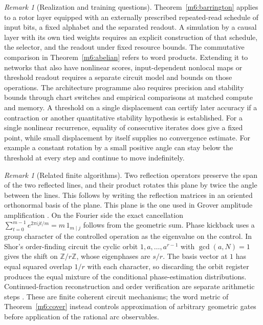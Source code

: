 \documentclass[11pt,reqno]{amsart}
\theoremstyle{definition}
\theoremstyle{remark}
\newtheorem{remark}[theorem]{Remark}
\numberwithin{equation}{section}
\newcommand{\Z}{\mathbb{Z}}
\begin{document}
\begin{remark}[Realization and training questions]\label{m6:architecture-programme}
Theorem~\ref{m6:barrington} applies to a rotor layer equipped
with an externally prescribed repeated-read schedule of
input bits, a fixed alphabet and the separated readout.
A simulation by a causal layer with its own tied weights
requires an explicit construction of that schedule, the
selector, and the readout under fixed resource bounds. The
commutative comparison in Theorem~\ref{m6:abelian} refers to
word products. Extending it to networks that also have
nonlinear scores, input-dependent nonlocal maps or threshold
readout requires a separate circuit model and bounds on those
operations. The architecture programme also requires precision
and stability bounds through chart switches and empirical
comparisons at matched compute and memory. A threshold on a
single displacement can certify later accuracy if a contraction
or another quantitative stability hypothesis is established.
For a single nonlinear recurrence, equality of consecutive
iterates does give a fixed point, while small displacement by
itself supplies no convergence estimate. For example a constant
rotation by a small positive angle can stay below the threshold
at every step and continue to move indefinitely.
\end{remark}

\begin{remark}[Related finite algorithms]\label{m6:algorithms}
Two reflection operators preserve the span of the two reflected
lines, and their product rotates this plane by twice the angle
between the lines. This follows by writing the reflection
matrices in an oriented orthonormal basis of the plane. This
plane is the one used in Grover amplitude amplification
\cite{m6:Grover}. On the Fourier side the exact cancellation
\(\sum_{t=0}^{m-1} e^{2\pi ijt/m}=m\,1_{m\mid j}\)
follows from the geometric sum. Phase kickback uses a group
character of the controlled operation as the eigenvalue on
the control. In Shor's order-finding circuit the cyclic
orbit \(1,a,\dots,a^{r-1}\) with \(\gcd(a,N)=1\) gives the
shift on \(\Z/r\Z\), whose eigenphases are \(s/r\).
The basis vector at \(1\) has equal squared overlap \(1/r\)
with each character, so discarding the orbit register produces
the equal mixture of the conditional phase-estimation
distributions. Continued-fraction reconstruction and order
verification are separate arithmetic steps
\cite{m6:Shor}. These are finite coherent circuit mechanisms;
the word metric of Theorem~\ref{m6:cover} instead controls
approximation of arbitrary geometric gates before application
of the rational arc observables.
\end{remark}
\end{document}
